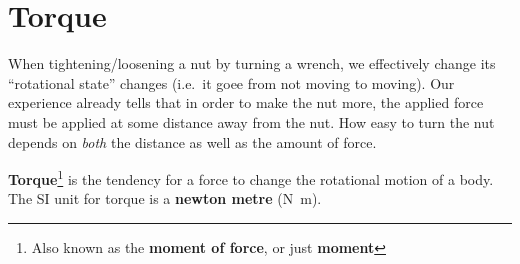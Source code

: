 \section{Torque}


When tightening/loosening a nut by turning a wrench, we effectively change
its ``rotational state'' changes (i.e.\ it goee from not moving to moving).
Our experience already tells that in order to make the nut more, the applied
force must be applied at some distance away from the nut. How easy to turn the
nut depends on \emph{both} the distance as well as the amount of force.

\textbf{Torque}\footnote{Also known as the \textbf{moment of force}, or just
\textbf{moment}} is the tendency for a force to change the rotational motion
of a body.
The SI unit for torque is a \textbf{newton metre} (\si{\newton\metre}).

